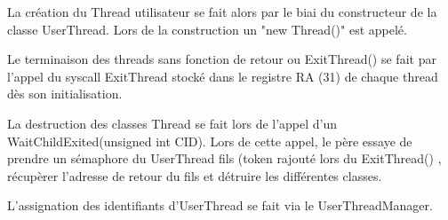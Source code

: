 \documentclass{article}
\begin{document}
La création du Thread utilisateur se fait alors par le biai du constructeur de la classe UserThread. Lors de la construction un "new Thread()" est appelé. 



Le terminaison des threads sans fonction de retour ou ExitThread() se fait par l'appel du syscall ExitThread stocké dans le registre RA (31) de chaque thread dès son initialisation.

La destruction des classes Thread se fait lors de l'appel d'un WaitChildExited(unsigned int CID). Lors de cette appel, le père essaye de prendre un sémaphore du UserThread fils (token rajouté lors du ExitThread() , récupèrer l'adresse de retour du fils et détruire les différentes classes.

L'assignation des identifiants d'UserThread se fait via le UserThreadManager.
\end{document}
